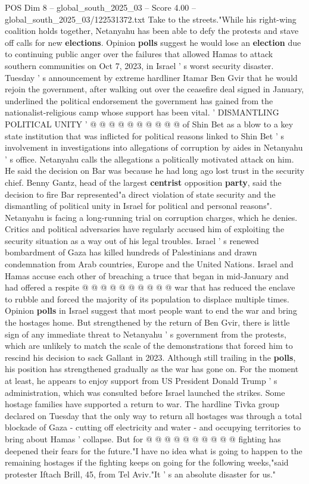 \begin{textsample}{POS Dim 8 – global\_south\_2025\_03 – Score 4.00 – global\_south\_2025\_03/122531372.txt}
Take to the streets."While his right-wing coalition holds together, Netanyahu has been able to defy the protests and stave off calls for new \textbf{elections}.
Opinion \textbf{polls} suggest he would lose an \textbf{election} due to continuing public anger over the failures that allowed Hamas to attack southern communities on Oct 7, 2023, in Israel ' s worst security disaster.
Tuesday ' s announcement by extreme hardliner Itamar Ben Gvir that he would rejoin the government, after walking out over the ceasefire deal signed in January, underlined the political endorsement the government has gained from the nationalist-religious camp whose support has been vital. ' DISMANTLING POLITICAL UNITY ' @ @ @ @ @ @ @ @ @ @ of Shin Bet as a blow to a key state institution that was inflicted for political reasons linked to Shin Bet ' s involvement in investigations into allegations of corruption by aides in Netanyahu ' s office.
Netanyahu calls the allegations a politically motivated attack on him.
He said the decision on Bar was because he had long ago lost trust in the security chief.
Benny Gantz, head of the largest \textbf{centrist} opposition \textbf{party}, said the decision to fire Bar represented"a direct violation of state security and the dismantling of political unity in Israel for political and personal reasons".
Netanyahu is facing a long-running trial on corruption charges, which he denies.
Critics and political adversaries have regularly accused him of exploiting the security situation as a way out of his legal troubles.
Israel ' s renewed bombardment of Gaza has killed hundreds of Palestinians and drawn condemnation from Arab countries, Europe and the United Nations.
Israel and Hamas accuse each other of breaching a truce that began in mid-January and had offered a respite @ @ @ @ @ @ @ @ @ @ war that has reduced the enclave to rubble and forced the majority of its population to displace multiple times.
Opinion \textbf{polls} in Israel suggest that most people want to end the war and bring the hostages home.
But strengthened by the return of Ben Gvir, there is little sign of any immediate threat to Netanyahu ' s government from the protests, which are unlikely to match the scale of the demonstrations that forced him to rescind his decision to sack Gallant in 2023.
Although still trailing in the \textbf{polls}, his position has strengthened gradually as the war has gone on.
For the moment at least, he appears to enjoy support from US President Donald Trump ' s administration, which was consulted before Israel launched the strikes.
Some hostage families have supported a return to war.
The hardline Tivka group declared on Tuesday that the only way to return all hostages was through a total blockade of Gaza - cutting off electricity and water - and occupying territories to bring about Hamas ' collapse.
But for @ @ @ @ @ @ @ @ @ @ fighting has deepened their fears for the future."I have no idea what is going to happen to the remaining hostages if the fighting keeps on going for the following weeks,"said protester Iftach Brill, 45, from Tel Aviv."It ' s an absolute disaster for us."

\end{textsample}
